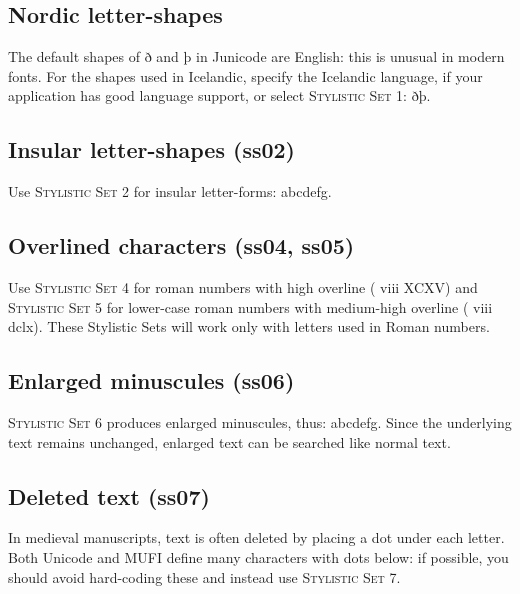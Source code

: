 \documentclass[12pt,a4paper,openany]{book}
\begin{document}
\subsection*{Nordic letter-shapes}

The default shapes of ð and þ in Junicode are English: this is unusual in
modern fonts. For the shapes used in Icelandic, specify the Icelandic
language, if your application has good language support, or select
{\scshape Stylistic Set 1}: { ðþ}.

\subsection*{Insular letter-shapes (ss02)}

Use {\scshape Stylistic Set 2} for insular letter-forms:
{ abcdefg.}

\subsection*{Overlined characters (ss04, ss05)}

Use {\scshape Stylistic Set 4} for roman numbers with high overline
({ viii XCXV}) and {\scshape Stylistic Set 5}
for lower-case roman numbers with medium-high overline
({ viii dclx}). These Stylistic
Sets will work only with letters used in Roman numbers.

\subsection*{Enlarged minuscules (ss06)}

{\scshape Stylistic Set 6} produces enlarged minuscules, thus:
{ abcdefg.} Since the underlying
text remains unchanged, enlarged text can be searched like normal
text.

\subsection*{Deleted text (ss07)}

In medieval manuscripts, text is often deleted by placing a dot under each
letter. Both Unicode and MUFI define many characters with dots below:
{ if possible, you should avoid
hard-coding these and instead use} {\scshape Stylistic Set 7}.
\end{document}
